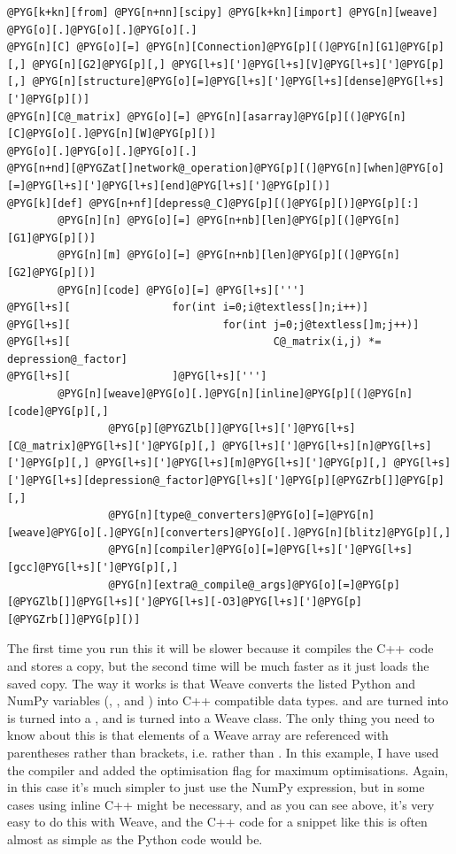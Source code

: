\documentclass[letterpaper,10pt,english]{manual}
\begin{document}
\begin{Verbatim}[commandchars=@\[\]]
@PYG[k+kn][from] @PYG[n+nn][scipy] @PYG[k+kn][import] @PYG[n][weave]
@PYG[o][.]@PYG[o][.]@PYG[o][.]
@PYG[n][C] @PYG[o][=] @PYG[n][Connection]@PYG[p][(]@PYG[n][G1]@PYG[p][,] @PYG[n][G2]@PYG[p][,] @PYG[l+s][']@PYG[l+s][V]@PYG[l+s][']@PYG[p][,] @PYG[n][structure]@PYG[o][=]@PYG[l+s][']@PYG[l+s][dense]@PYG[l+s][']@PYG[p][)]
@PYG[n][C@_matrix] @PYG[o][=] @PYG[n][asarray]@PYG[p][(]@PYG[n][C]@PYG[o][.]@PYG[n][W]@PYG[p][)]
@PYG[o][.]@PYG[o][.]@PYG[o][.]
@PYG[n+nd][@PYGZat[]network@_operation]@PYG[p][(]@PYG[n][when]@PYG[o][=]@PYG[l+s][']@PYG[l+s][end]@PYG[l+s][']@PYG[p][)]
@PYG[k][def] @PYG[n+nf][depress@_C]@PYG[p][(]@PYG[p][)]@PYG[p][:]
        @PYG[n][n] @PYG[o][=] @PYG[n+nb][len]@PYG[p][(]@PYG[n][G1]@PYG[p][)]
        @PYG[n][m] @PYG[o][=] @PYG[n+nb][len]@PYG[p][(]@PYG[n][G2]@PYG[p][)]
        @PYG[n][code] @PYG[o][=] @PYG[l+s][''']
@PYG[l+s][                for(int i=0;i@textless[]n;i++)]
@PYG[l+s][                        for(int j=0;j@textless[]m;j++)]
@PYG[l+s][                                C@_matrix(i,j) *= depression@_factor]
@PYG[l+s][                ]@PYG[l+s][''']
        @PYG[n][weave]@PYG[o][.]@PYG[n][inline]@PYG[p][(]@PYG[n][code]@PYG[p][,]
                @PYG[p][@PYGZlb[]]@PYG[l+s][']@PYG[l+s][C@_matrix]@PYG[l+s][']@PYG[p][,] @PYG[l+s][']@PYG[l+s][n]@PYG[l+s][']@PYG[p][,] @PYG[l+s][']@PYG[l+s][m]@PYG[l+s][']@PYG[p][,] @PYG[l+s][']@PYG[l+s][depression@_factor]@PYG[l+s][']@PYG[p][@PYGZrb[]]@PYG[p][,]
                @PYG[n][type@_converters]@PYG[o][=]@PYG[n][weave]@PYG[o][.]@PYG[n][converters]@PYG[o][.]@PYG[n][blitz]@PYG[p][,]
                @PYG[n][compiler]@PYG[o][=]@PYG[l+s][']@PYG[l+s][gcc]@PYG[l+s][']@PYG[p][,]
                @PYG[n][extra@_compile@_args]@PYG[o][=]@PYG[p][@PYGZlb[]]@PYG[l+s][']@PYG[l+s][-O3]@PYG[l+s][']@PYG[p][@PYGZrb[]]@PYG[p][)]
\end{Verbatim}

The first time you run this it will be slower because it compiles the
C++ code and stores a copy, but the second time will be much faster as
it just loads the saved copy. The way it works is that Weave converts
the listed Python and NumPy variables (, , 
and ) into C++ compatible data types.  and
 are turned into  is turned into
a , and  is turned into a Weave
 class. The only thing you need to know about this is that
elements of a Weave array are referenced with parentheses rather than
brackets, i.e.  rather than . In
this example, I have used the  compiler and added the optimisation
flag  for maximum optimisations. Again, in this case it's much
simpler to just use the  NumPy expression,
but in some cases using inline C++ might be necessary, and as you can see
above, it's very easy to do this with Weave, and the C++ code for a
snippet like this is often almost as simple as the Python code would be.
\end{document}
